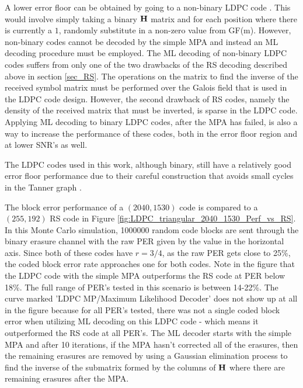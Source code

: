 \documentclass[conference]{IEEEtran}
\begin{document}
A lower error floor can be obtained by going to a non-binary LDPC code \cite{Garrammone_NonbinaryLDPC-10}.  This would involve simply taking a binary $\bf{H}$ matrix and for each position where there is currently a $1$, randomly substitute in a non-zero value from GF(m).  However, non-binary codes cannot be decoded by the simple MPA and instead an ML decoding procedure must be employed.  The ML decoding of non-binary LDPC codes suffers from only one of the two drawbacks of the RS decoding described above in section \ref{sec_RS}.  The operations  on the matrix to find the inverse of the received symbol matrix must be performed over the Galois field that is used in the LDPC code design.  However, the second drawback of RS codes, namely the density of the received matrix that must be inverted, is sparse in the LDPC code.  Applying ML decoding to binary LDPC codes, after the MPA has failed, is also a way to increase the performance of these codes, both in the error floor region and at lower SNR's as well.

The LDPC codes used in this work, although binary, still have a relatively good error floor performance due to their careful construction that avoids small cycles in the Tanner graph \cite{tanner-01}.  

The block error performance of a $(2040, 1530)$ code is compared to a $(255, 192)$ RS code in Figure \ref{fig:LDPC_triangular_2040_1530_Perf_vs_RS}.  In this Monte Carlo simulation, 1000000 random code blocks are sent through the binary erasure channel with the raw PER given by the value in the horizontal axis.  Since both of these codes have $r = 3/4$, as the raw PER gets close to 25\%, the coded block error rate approaches one for both codes.  Note in the figure that the LDPC code with the simple MPA outperforms the RS code at PER below 18\%.  The full range of PER's tested in this scenario is between 14-22\%.  The curve marked 'LDPC MP/Maximum Likelihood Decoder' does not show up at all in the figure because for all PER's tested, there was not a single coded block error when utilizing ML decoding on this LDPC code - which means it outperformed the RS code at all PER's.  The ML decoder starts with the simple MPA and after 10 iterations, if the MPA hasn't corrected all of the erasures, then the remaining erasures are removed by using a Gaussian elimination process to find the inverse of the submatrix formed by the columns of $\bf{H}$ where there are remaining erasures after the MPA.
\end{document}
